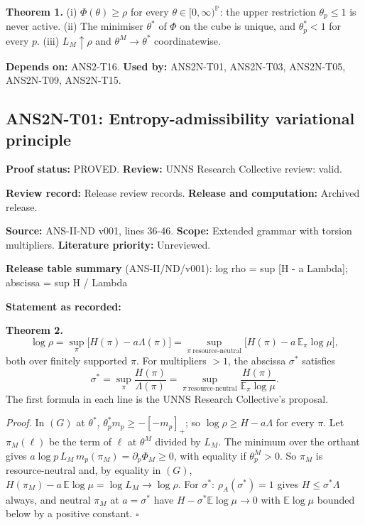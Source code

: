\documentclass[
  11pt,
]{article}
\begin{document}
\textbf{Theorem 1.} (i) \(\Phi(\theta)\ge\rho\) for every
\(\theta\in[0,\infty)^{\mathbb P}\): the upper restriction
\(\theta_p\le1\) is never active. (ii) The minimiser \(\theta^\ast\) of
\(\Phi\) on the cube is unique, and \(\theta^\ast_p<1\) for every \(p\).
(iii) \(L_M\uparrow\rho\) and \(\theta^M\to\theta^\ast\) coordinatewise.

\textbf{Depends on:} ANS2-T16. \textbf{Used by:} ANS2N-T01, ANS2N-T03,
ANS2N-T05, ANS2N-T09, ANS2N-T15.

\hypertarget{ans2n-t01-entropy-admissibility-variational-principle}{%
\subsection{ANS2N-T01: Entropy-admissibility variational
principle}\label{ans2n-t01-entropy-admissibility-variational-principle}}

\textbf{Proof status:} PROVED. \textbf{Review:} UNNS Research Collective
review: valid.

\textbf{Review record:} Release review records. \textbf{Release and
computation:} Archived release.

\textbf{Source:} ANS-II-ND v001, lines 36-46. \textbf{Scope:} Extended
grammar with torsion multipliers. \textbf{Literature priority:}
Unreviewed.

\textbf{Release table summary} (ANS-II/ND/v001): log rho = sup {[}H - a
Lambda{]}; abscissa = sup H / Lambda

\textbf{Statement as recorded:}

\textbf{Theorem 2.}
\[\log\rho=\sup_{\pi}\big[H(\pi)-a\Lambda(\pi)\big]=\sup_{\pi\ \text{resource-neutral}}\big[H(\pi)-a\,\mathbb E_\pi\log\mu\big],\]
both over finitely supported \(\pi\). For multipliers \(>1\), the
abscissa \(\sigma^\ast\) satisfies
\[\sigma^\ast=\sup_\pi\frac{H(\pi)}{\Lambda(\pi)}=\sup_{\pi\ \text{resource-neutral}}\frac{H(\pi)}{\mathbb E_\pi\log\mu}.\]
The first formula in each line is the UNNS Research Collective's
proposal.

\emph{Proof.} In \((G)\) at \(\theta^\ast\),
\(\theta^\ast_pm_p\ge-[-m_p]_+\); so \(\log\rho\ge H-a\Lambda\) for
every \(\pi\). Let \(\pi_M(\ell)\) be the term of \(\ell\) at
\(\theta^M\) divided by \(L_M\). The minimum over the orthant gives
\(a\log p\,L_M\,m_p(\pi_M)=\partial_p\Phi_M\ge0\), with equality if
\(\theta^M_p>0\). So \(\pi_M\) is resource-neutral and, by equality in
\((G)\), \(H(\pi_M)-a\,\mathbb E\log\mu=\log L_M\to\log\rho\). For
\(\sigma^\ast\): \(\rho_A(\sigma^\ast)=1\) gives
\(H\le\sigma^\ast\Lambda\) always, and neutral \(\pi_M\) at
\(a=\sigma^\ast\) have \(H-\sigma^\ast\mathbb E\log\mu\to0\) with
\(\mathbb E\log\mu\) bounded below by a positive constant. \(\square\)
\end{document}
